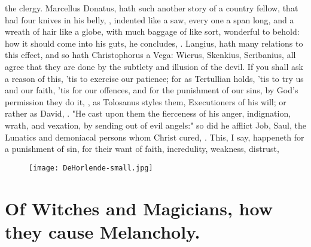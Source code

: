 the clergy. Marcellus Donatus,  hath such another story of a country fellow, that had four knives in
his belly, , indented like a saw, every one a span
long, and a wreath of hair like a globe, with much baggage of like sort,
wonderful to behold: how it should come into his guts, he concludes, . Langius,  hath many relations to this effect, and so hath
Christophorus a Vega: Wierus, Skenkius, Scribanius, all agree that they are
done by the subtlety and illusion of the devil. If you shall ask a reason of
this, 'tis to exercise our patience; for as Tertullian
holds,  'tis to try us and our faith, 'tis for our offences, and for
the punishment of our sins, by God's permission they do it, , as Tolosanus styles them,
Executioners of his will; or rather as David, . "He
cast upon them the fierceness of his anger, indignation, wrath, and vexation,
by sending out of evil angels:" so did he afflict Job, Saul, the Lunatics and
demoniacal persons whom Christ cured, . \etc{} This, I say,
happeneth for a punishment of sin, for their want of faith, incredulity,
weakness, distrust, \etc{}

\cleartoleftpage{}
\begin{figure}[p]
  \begingroup
  \centering
  \texttt{[image: DeHorlende-small.jpg]}
  \label{fig:dehorlende}
\end{figure}

\clearpage{}
\thispagestyle{titleontop}

\section[Witches and Magicians]{Of Witches and Magicians, how they cause Melancholy.}

